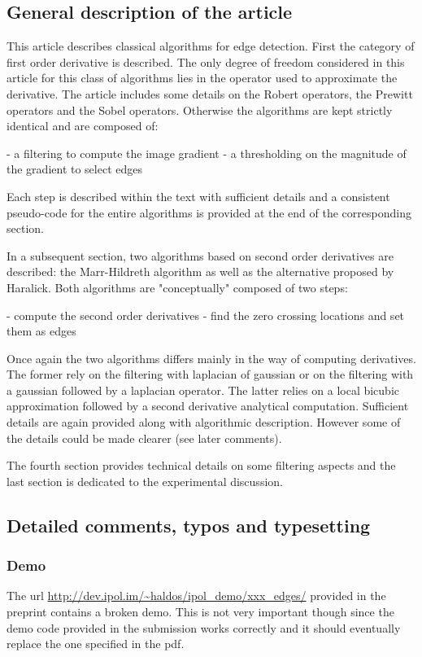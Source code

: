 \documentclass[a4paper,10pt]{report}
\begin{document}
\subsection{General description of the article}
This article describes classical algorithms for edge detection. First the
category of first order derivative is described. The only degree of freedom
considered in this article for this class of algorithms lies in the operator
used to approximate the derivative. The article includes some details on the
Robert operators, the Prewitt operators and the Sobel operators. Otherwise the
algorithms are kept strictly identical and are composed of:

- a filtering to compute the image gradient
- a thresholding on the magnitude of the gradient to select edges

Each step is described within the text with sufficient details and a consistent
pseudo-code for the entire algorithms is provided at the end of the
corresponding section.

In a subsequent section, two algorithms based on second order derivatives are
described: the Marr-Hildreth algorithm as well as the alternative proposed by
Haralick. Both algorithms are "conceptually" composed of two steps:

- compute the second order derivatives
- find the zero crossing locations and set them as edges

Once again the two algorithms differs mainly in the way of computing
derivatives. The former rely on the filtering with laplacian of gaussian or on
the filtering with a gaussian followed by a laplacian operator. The latter
relies on a local bicubic approximation followed by a second derivative
analytical computation. Sufficient details are again provided along with
algorithmic description. However some of the details could be made clearer (see
later comments).

The fourth section provides technical details on some filtering aspects and the
last section is dedicated to the experimental discussion.


\subsection{Detailed comments, typos and typesetting}
\subsubsection{Demo}
\que The url \url{http://dev.ipol.im/~haldos/ipol_demo/xxx_edges/} provided in the preprint
contains a broken demo. This is not very important though since the demo code
provided in the submission works correctly and it should eventually replace the
one specified in the pdf.\\
\end{document}
